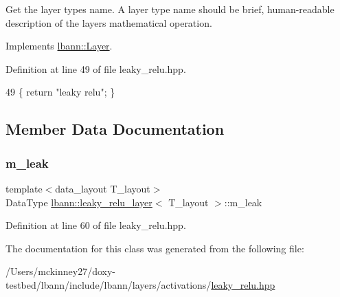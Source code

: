Get the layer type\textquotesingle{}s name. A layer type name should be brief, human-\/readable description of the layer\textquotesingle{}s mathematical operation. 

Implements \hyperlink{classlbann_1_1Layer_a0fa0ea9160b490c151c0a17fde4f7239}{lbann\+::\+Layer}.



Definition at line 49 of file leaky\+\_\+relu.\+hpp.


\begin{DoxyCode}
49 \{ \textcolor{keywordflow}{return} \textcolor{stringliteral}{"leaky relu"}; \}
\end{DoxyCode}


\subsection{Member Data Documentation}
\mbox{\label{classlbann_1_1leaky__relu__layer_afafa6711960f1114b6247fcb5a30c36f}} 
\subsubsection{\texorpdfstring{m\+\_\+leak}{m\_leak}}
{\footnotesize\ttfamily template$<$data\+\_\+layout T\+\_\+layout$>$ \\
Data\+Type \hyperlink{classlbann_1_1leaky__relu__layer}{lbann\+::leaky\+\_\+relu\+\_\+layer}$<$ T\+\_\+layout $>$\+::m\+\_\+leak\hspace{0.3cm}{\ttfamily [private]}}



Definition at line 60 of file leaky\+\_\+relu.\+hpp.



The documentation for this class was generated from the following file\+:\begin{DoxyCompactItemize}
\item 
/\+Users/mckinney27/doxy-\/testbed/lbann/include/lbann/layers/activations/\hyperlink{leaky__relu_8hpp}{leaky\+\_\+relu.\+hpp}\end{DoxyCompactItemize}
